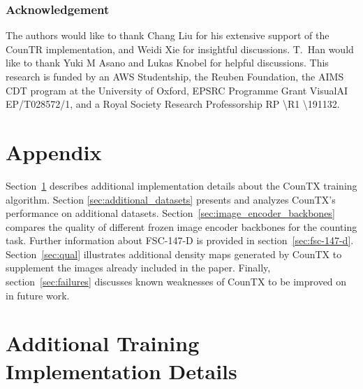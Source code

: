 \documentclass{bmvc2k}
\begin{document}
\subsubsection*{Acknowledgement}
The authors would like to thank Chang Liu for his extensive support of the CounTR implementation, and Weidi Xie for insightful discussions. T.\ Han would like to thank Yuki M Asano and Lukas Knobel for helpful discussions. This research is funded by an AWS Studentship, the Reuben Foundation, the AIMS CDT program at the University of Oxford, EPSRC Programme Grant VisualAI EP/T028572/1, and a Royal Society Research Professorship RP \textbackslash R1 \textbackslash 191132. 
\newpage

\vspace{10mm}
\section*{Appendix}
\appendix
Section~\ref{sec:add_imp_details} describes 
additional implementation details about the CounTX training algorithm. Section \ref{sec:additional_datasets} presents and analyzes CounTX's performance on additional datasets. Section~\ref{sec:image_encoder_backbones} compares the quality of different frozen image encoder backbones for the counting task. Further information about FSC-147-D is provided in section~\ref{sec:fsc-147-d}. Section~\ref{sec:qual} illustrates additional density maps generated by CounTX to supplement the images already included in the paper. Finally, section~\ref{sec:failures} discusses known weaknesses of CounTX to be improved on in future work. \section{Additional Training Implementation Details}
\label{sec:add_imp_details}
\end{document}
